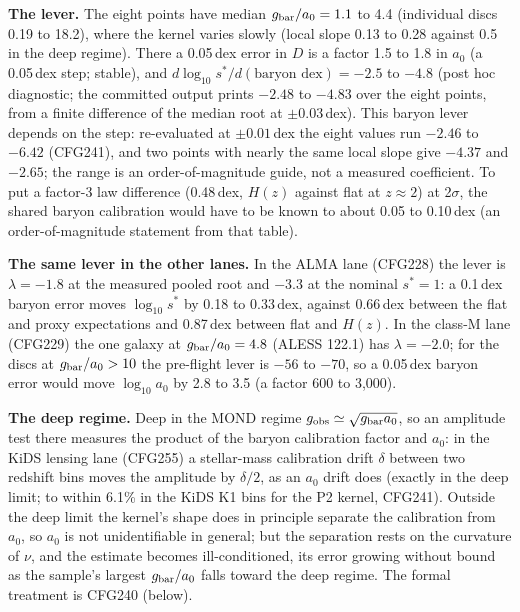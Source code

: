 \documentclass[10pt]{article}
\begin{document}
\textbf{The lever.} The eight points have median $g_{\rm bar}/a_0=1.1$ to 4.4 (individual discs 0.19 to 18.2), where the kernel varies slowly (local slope 0.13 to 0.28 against 0.5 in the deep regime). There a 0.05\,dex error in $D$ is a factor 1.5 to 1.8 in $a_0$ (a 0.05\,dex step; stable), and $d\log_{10}s^*/d(\text{baryon dex})=-2.5$ to $-4.8$ (post hoc diagnostic; the committed output prints $-2.48$ to $-4.83$ over the eight points, from a finite difference of the median root at $\pm0.03$\,dex). This baryon lever depends on the step: re-evaluated at $\pm0.01$\,dex the eight values run $-2.46$ to $-6.42$ (CFG241), and two points with nearly the same local slope give $-4.37$ and $-2.65$; the range is an order-of-magnitude guide, not a measured coefficient. To put a factor-3 law difference (0.48\,dex, $H(z)$ against flat at $z\approx2$) at 2$\sigma$, the shared baryon calibration would have to be known to about 0.05 to 0.10\,dex (an order-of-magnitude statement from that table).

\textbf{The same lever in the other lanes.} In the ALMA lane (CFG228) the lever is $\lambda=-1.8$ at the measured pooled root and $-3.3$ at the nominal $s^*=1$: a 0.1\,dex baryon error moves $\log_{10}s^*$ by 0.18 to 0.33\,dex, against 0.66\,dex between the flat and proxy expectations and 0.87\,dex between flat and $H(z)$. In the class-M lane (CFG229) the one galaxy at $g_{\rm bar}/a_0=4.8$ (ALESS 122.1) has $\lambda=-2.0$; for the discs at $g_{\rm bar}/a_0>10$ the pre-flight lever is $-56$ to $-70$, so a 0.05\,dex baryon error would move $\log_{10}a_0$ by 2.8 to 3.5 (a factor 600 to 3,000).

\textbf{The deep regime.} Deep in the MOND regime $g_{\rm obs}\simeq\sqrt{g_{\rm bar}a_0}$, so an amplitude test there measures the product of the baryon calibration factor and $a_0$: in the KiDS lensing lane (CFG255) a stellar-mass calibration drift $\delta$ between two redshift bins moves the amplitude by $\delta/2$, as an $a_0$ drift does (exactly in the deep limit; to within 6.1\% in the KiDS K1 bins for the P2 kernel, CFG241). Outside the deep limit the kernel's shape does in principle separate the calibration from $a_0$, so $a_0$ is not unidentifiable in general; but the separation rests on the curvature of $\nu$, and the estimate becomes ill-conditioned, its error growing without bound as the sample's largest $g_{\rm bar}/a_0$ falls toward the deep regime. The formal treatment is CFG240 (below).
\end{document}
